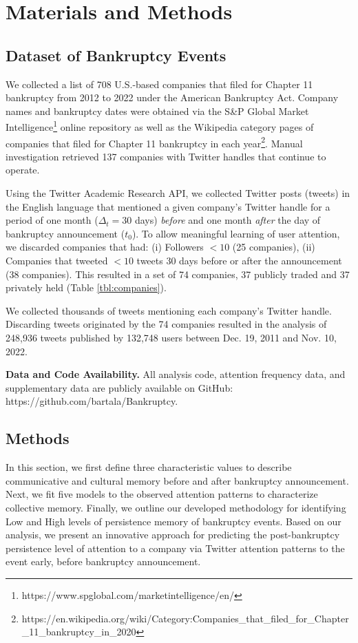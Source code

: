 \documentclass[9pt,twocolumn,twoside,lineno]{pnas-new}
\begin{document}
\section*{Materials and Methods}
\label{sec:Material_and_Methods}
\subsection*{Dataset of Bankruptcy Events}
We collected a list of 708 U.S.-based companies that filed for Chapter 11 bankruptcy from 2012 to 2022 under the American Bankruptcy Act.
Company names and bankruptcy dates were obtained via the S\&P Global Market Intelligence\footnote{https://www.spglobal.com/marketintelligence/en/} online repository as well as the Wikipedia category pages of companies that filed for Chapter 11 bankruptcy in each year\footnote{https://en.wikipedia.org/wiki/Category:Companies\_that\_filed\_for\_Chapter\_11\_bankruptcy\_in\_2020}.
Manual investigation retrieved 137 companies with Twitter handles that continue to operate.

Using the Twitter Academic Research API, we collected Twitter posts (tweets) in the English language that mentioned a given company's Twitter handle for a period of one month ($\Delta_t =30$ days) \textit{before} and one month \textit{after} the day of bankruptcy announcement ($t_0$).
To allow meaningful learning of user attention, we discarded companies that had:
(i) Followers $<10$ (25 companies),
(ii) Companies that tweeted $<10$ tweets 30 days before or after the announcement (38 companies).
This resulted in a set of 74 companies, 37 publicly traded and 37 privately held (Table \ref{tbl:companies}).

We collected thousands of tweets mentioning each company's Twitter handle.
Discarding tweets originated by the 74 companies resulted in the analysis of 248,936 tweets published by 132,748 users between Dec. 19, 2011 and Nov. 10, 2022.

\textbf{Data and Code Availability.}
All analysis code, attention frequency data, and supplementary data are publicly available on GitHub: https://github.com/bartala/Bankruptcy.

\subsection*{Methods}
\label{sec:methods}
In this section, we first define three characteristic values \cite{west2021postmortem} to describe communicative and cultural memory before and after bankruptcy announcement.
Next, we fit five models to the observed attention patterns to characterize collective memory.
Finally, we outline our developed methodology for identifying Low and High levels of persistence memory of bankruptcy events.
Based on our analysis, we present an innovative approach for predicting the post-bankruptcy persistence level of attention to a company via Twitter attention patterns to the event early, before bankruptcy announcement.
\end{document}
